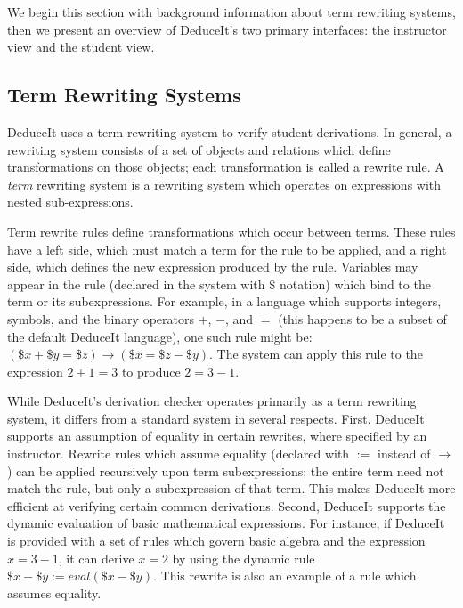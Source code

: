 \documentclass{sigchi}
\begin{document}
We begin this section with background information about term rewriting systems, then we present an overview of DeduceIt's two primary interfaces: the instructor view and the student view.

\subsection{Term Rewriting Systems}

DeduceIt uses a term rewriting system to verify student derivations. In general, a rewriting system consists of a set of objects and relations which define transformations on those objects; each transformation is called a rewrite rule. A \textit{term} rewriting system is a rewriting system which operates on expressions with nested sub-expressions. \cite{rewriting-logic, isabelle}

Term rewrite rules define transformations which occur between terms. These rules have a left side, which must match a term for the rule to be applied, and a right side, which defines the new expression produced by the rule. Variables may appear in the rule (declared in the system with $\$$ notation) which bind to the term or its subexpressions. For example, in a language which supports integers, symbols, and the binary operators $+$, $-$, and $=$ (this happens to be a subset of the default DeduceIt language), one such rule might be: $(\$x+\$y=\$z) \rightarrow (\$x=\$z-\$y)$. The system can apply this rule to the expression $2+1=3$ to produce $2=3-1$.

While DeduceIt's derivation checker operates primarily as a term rewriting system, it differs from a standard system in several respects. First, DeduceIt supports an assumption of equality in certain rewrites, where specified by an instructor. Rewrite rules which assume equality (declared with $:=$ instead of $\rightarrow$) can be applied recursively upon term subexpressions; the entire term need not match the rule, but only a subexpression of that term. This makes DeduceIt more efficient at verifying certain common derivations. Second, DeduceIt supports the dynamic evaluation of basic mathematical expressions. \cite{dynamic-rules} For instance, if DeduceIt is provided with a set of rules which govern basic algebra and the expression $x=3-1$, it can derive $x=2$ by using the dynamic rule $\$x-\$y := eval(\$x-\$y)$. This rewrite is also an example of a rule which assumes equality.

\end{document}
